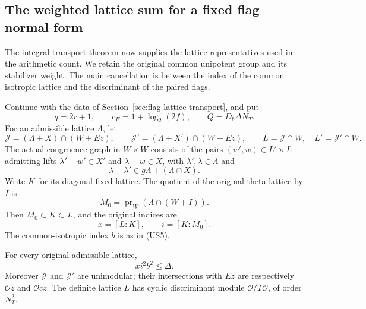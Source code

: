 \subsection{The weighted lattice sum for a fixed flag normal form}
\label{sec:weighted-flag-lattice-sum}

The integral transport theorem now supplies the lattice
representatives used in the arithmetic count.  We retain
the original common unipotent group and its stabilizer
weight.  The main cancellation is between the index of
the common isotropic lattice and the discriminant of the
paired flags.

Continue with the data of
Section~\ref{sec:flag-lattice-transport}, and put
\[
        q=2r+1,\qquad c_E=1+\log_2(2f),\qquad
        Q=D_b\Delta N_T.
\]
For an admissible lattice $\Lambda$, let
\[
 \mathcal J=(\Lambda+X)\cap(W+Ez),\qquad
 \mathcal J'=(\Lambda+X')\cap(W+Ez),\qquad
 L=\mathcal J\cap W,\quad L'=\mathcal J'\cap W.
 \tag{WF1}
\]
The actual congruence graph in $W\times W$ consists of
the pairs $(w',w)\in L'\times L$ admitting lifts
$\lambda'-w'\in X'$ and $\lambda-w\in X$, with
$\lambda',\lambda\in\Lambda$ and
\[
                 \lambda-\lambda'
                         \in g\Lambda+(\Lambda\cap X).
 \tag{WF2}
\]
Write $K$ for its diagonal fixed lattice.  The quotient
of the original theta lattice by $I$ is
\[
          M_0=\operatorname{pr}_W(\Lambda\cap(W+I)).
\]
Then $M_0\subset K\subset L$, and the original indices
are
\[
                     x=[L:K],\qquad i=[K:M_0].
 \tag{WF3}
\]
The common-isotropic index $b$ is as in (US5).

\begin{lemma}
\label{lem:flag-fixed-index-constraint}
For every original admissible lattice,
\[
                            xi^2b^2\leq\Delta.
 \tag{WF4}
\]
Moreover $\mathcal J$ and $\mathcal J'$ are unimodular;
their intersections with $Ez$ are respectively
$\mathcal O z$ and $\mathcal O cz$.
The definite lattice $L$ has cyclic discriminant module
$\mathcal O/T\mathcal O$, of order $N_T^2$.
\end{lemma}


